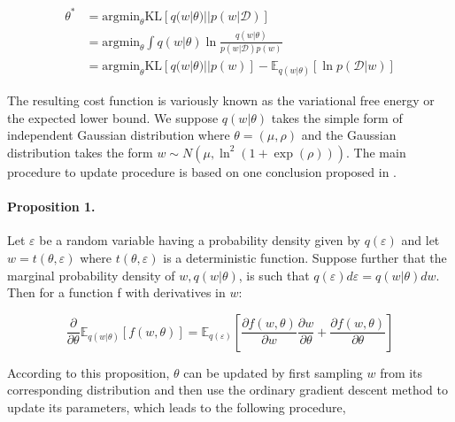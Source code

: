 \documentclass[a4paper,12pt]{article}
\begin{document}
\begin{equation}
\begin{aligned}
\theta^* &= \textrm{argmin}_\theta \textrm{KL}[q(w|\theta)||p(w|\mathcal{D})]\\
& = \textrm{argmin}_\theta \int q(w|\theta)\ln \frac{q(w|\theta)}{p(w | \mathcal{D})p(w)}\\
& =  \textrm{argmin}_\theta \textrm{KL} [q(w|\theta) ||  p(w)] - \mathbb{E}_{q(w|\theta)} [\ln p(\mathcal{D}|w)]
\end{aligned}
\end{equation}

The resulting cost function is variously known as the variational free energy or the expected lower bound. We suppose $q(w | \theta)$ takes the simple form of independent Gaussian distribution where $\theta = (\mu, \rho)$ and the Gaussian distribution takes the form $w\sim N(\mu, \ln^2(1 + \exp(\rho)))$. The main procedure to update procedure is based on one conclusion proposed in \cite{BNN}. 

\paragraph{Proposition 1.}
Let $\varepsilon$ be a random variable having a probability density given by $q(\varepsilon)$ and let $w = t(\theta,\varepsilon)$ where $t(\theta,\varepsilon)$ is a deterministic function. Suppose further that the marginal probability density of $w, q(w|\theta)$, is such that $q(\varepsilon)d\varepsilon = q(w|\theta)dw$. Then for a function f with derivatives in $w$:

\begin{displaymath}
\frac{\partial}{\partial\theta}\mathbb{E}_{q(w|\theta)}[f(w, \theta)] =  \mathbb{E}_{q(\varepsilon)}\left[\frac{\partial f(w, \theta)}{\partial w}\frac{\partial w}{\partial\theta} + \frac{\partial f(w, \theta)}{\partial\theta}\right]
\end{displaymath}

According to this proposition, $\theta$ can be updated by first sampling $w$ from its corresponding distribution and then use the ordinary gradient descent method to update its parameters, which leads to the following procedure, 
\end{document}
